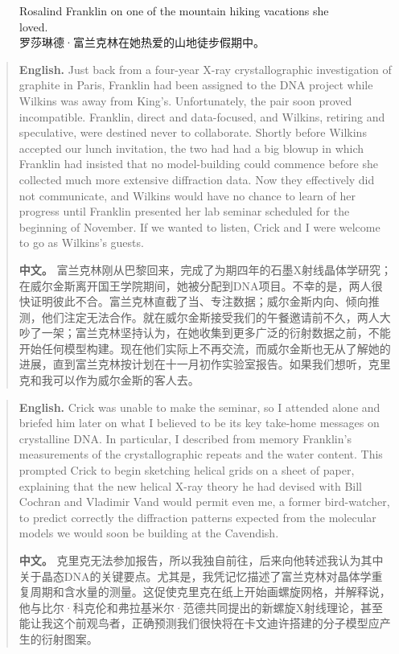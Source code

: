 \begin{figure}[htbp]
\centering
{}
\caption{Rosalind Franklin on one of the mountain hiking vacations she loved.\\罗莎琳德·富兰克林在她热爱的山地徒步假期中。}
\end{figure}

\begin{quote}
\noindent\textbf{English.} Just back from a four-year X-ray crystallographic investigation of graphite in Paris, Franklin had been assigned to the DNA project while Wilkins was away from King's. Unfortunately, the pair soon proved incompatible. Franklin, direct and data-focused, and Wilkins, retiring and speculative, were destined never to collaborate. Shortly before Wilkins accepted our lunch invitation, the two had had a big blowup in which Franklin had insisted that no model-building could commence before she collected much more extensive diffraction data. Now they effectively did not communicate, and Wilkins would have no chance to learn of her progress until Franklin presented her lab seminar scheduled for the beginning of November. If we wanted to listen, Crick and I were welcome to go as Wilkins's guests.

\smallskip
\noindent\textbf{中文。} 富兰克林刚从巴黎回来，完成了为期四年的石墨X射线晶体学研究；在威尔金斯离开国王学院期间，她被分配到DNA项目。不幸的是，两人很快证明彼此不合。富兰克林直截了当、专注数据；威尔金斯内向、倾向推测，他们注定无法合作。就在威尔金斯接受我们的午餐邀请前不久，两人大吵了一架；富兰克林坚持认为，在她收集到更多广泛的衍射数据之前，不能开始任何模型构建。现在他们实际上不再交流，而威尔金斯也无从了解她的进展，直到富兰克林按计划在十一月初作实验室报告。如果我们想听，克里克和我可以作为威尔金斯的客人去。
\end{quote}

\begin{quote}
\noindent\textbf{English.} Crick was unable to make the seminar, so I attended alone and briefed him later on what I believed to be its key take-home messages on crystalline DNA. In particular, I described from memory Franklin's measurements of the crystallographic repeats and the water content. This prompted Crick to begin sketching helical grids on a sheet of paper, explaining that the new helical X-ray theory he had devised with Bill Cochran and Vladimir Vand would permit even me, a former bird-watcher, to predict correctly the diffraction patterns expected from the molecular models we would soon be building at the Cavendish.

\smallskip
\noindent\textbf{中文。} 克里克无法参加报告，所以我独自前往，后来向他转述我认为其中关于晶态DNA的关键要点。尤其是，我凭记忆描述了富兰克林对晶体学重复周期和含水量的测量。这促使克里克在纸上开始画螺旋网格，并解释说，他与比尔·科克伦和弗拉基米尔·范德共同提出的新螺旋X射线理论，甚至能让我这个前观鸟者，正确预测我们很快将在卡文迪许搭建的分子模型应产生的衍射图案。
\end{quote}

